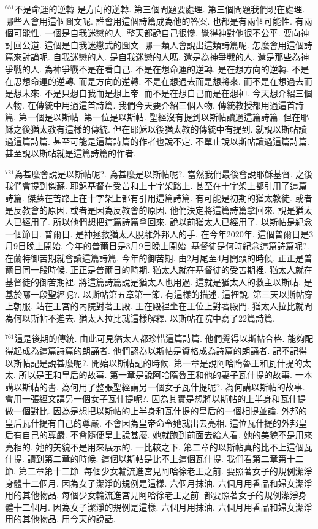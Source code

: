 \documentclass{book}
\begin{document}
$^{681}$不是命運的逆轉 是方向的逆轉.
第三個問題要處理.
第三個問題我們現在處理.
哪些人會用這個圖文呢.
誰會用這個詩篇成為他的答案.
也都是有兩個可能性.
有兩個可能性.
一個是自我迷戀的人.
整天都說自己很慘.
覺得神對他很不公平.
要向神討回公道.
這個是自我迷戀式的圖文.
哪一類人會說出這類詩篇呢.
怎麼會用這個詩篇來討論呢.
自我迷戀的人.
是自我迷戀的人嗎.
還是為神爭戰的人.
還是那些為神爭戰的人.
為神爭戰不是在看自己.
不是在想命運的逆轉.
是在想方向的逆轉.
不是在思想命運的逆轉.
而是方向的逆轉.
不是在想過去而是想將來.
而不是在想過去而是想未來.
不是只想自我而是想上帝.
而不是在想自己而是在想神.
今天想介紹三個人物.
在傳統中用過這首詩篇.
我們今天要介紹三個人物.
傳統教授都用過這首詩篇.
第一個是以斯帖.
第一位是以斯帖.
聖經沒有提到以斯帖讀過這篇詩篇.
但在耶穌之後猶太教有這樣的傳統.
但在耶穌以後猶太教的傳統中有提到.
就說以斯帖讀過這篇詩篇.
甚至可能是這篇詩篇的作者也說不定.
不單止說以斯帖讀過這篇詩篇.
甚至說以斯帖就是這篇詩篇的作者.

$^{721}$為甚麼會說是以斯帖呢?.
為甚麼是以斯帖呢?.
當然我們最後會說耶穌基督.
之後我們會提到傑蘇.
耶穌基督在受苦和上十字架路上.
甚至在十字架上都引用了這篇詩篇.
傑蘇在苦路上在十字架上都有引用這篇詩篇.
有可能是初期的猶太教徒.
或者是反教會的原因.
或者是因為反教會的原因.
他們決定將這篇詩篇拿回來.
說是猶太人已經用了.
所以他們想把這篇詩篇拿回來.
說以前猶太人已經用了.
以斯帖是紀念一個節日.
普爾日.
是神拯救猶太人脫離外邦人的手.
在今年2020年.
這個普爾日是3月9日晚上開始.
今年的普爾日是3月9日晚上開始.
基督徒是何時紀念這篇詩篇呢?.
在蘭特御苦期就會讀這篇詩篇.
今年的御苦期.
由2月尾至4月開頭的時候.
正正是普爾日同一段時候.
正正是普爾日的時期.
猶太人就在基督徒的受苦期裡.
猶太人就在基督徒的御苦期裡.
將這篇詩篇說是猶太人也用過.
這就是猶太人的救主以斯帖.
是基於哪一段聖經呢?.
以斯帖第五章第一節.
有這樣的描述.
這裡說.
第三天以斯帖穿上朝服.
站在王宮的內院對著王殿.
王在殿裡坐在王位上對著殿門.
猶太人拉比就問為何以斯帖不進去.
猶太人拉比就這樣解釋.
以斯帖在院中寫了22篇詩篇.

$^{761}$這是後期的傳統.
由此可見猶太人都珍惜這篇詩篇.
他們覺得以斯帖合格.
能夠配得起成為這篇詩篇的朗誦者.
他們認為以斯帖是資格成為詩篇的朗誦者.
記不記得以斯帖記是說甚麼呢?.
開始以斯帖記的時候.
第一章是說阿哈隋魯王和瓦什提的太太.
所以是王和皇后的故事.
第一章是說阿哈隋魯王和他的妻子瓦什提的故事.
一本講以斯帖的書.
為何用了整張聖經講另一個女子瓦什提呢?.
為何講以斯帖的故事.
會用一張經文講另一個女子瓦什提呢?.
因為其實是想將以斯帖的上半身和瓦什提做一個對比.
因為是想把以斯帖的上半身和瓦什提的皇后的一個相提並論.
外邦的皇后瓦什提有自己的尊嚴.
不會因為皇帝命令她就出去亮相.
這位瓦什提的外邦皇后有自己的尊嚴.
不會隨便皇上說甚麼.
她就跑到前面去給人看.
她的美貌不是用來亮相的.
她的美貌不是用來展示的.
一比較之下.
第二章的以斯帖真的比不上這個瓦什提.
讀到第二章的時候.
這個以斯帖是比不上這個瓦什提.
我們看第二章第十二節.
第二章第十二節.
每個少女輪流進宮見阿哈徐老王之前.
要照著女子的規例潔淨身體十二個月.
因為女子潔淨的規例是這樣.
六個月抹油.
六個月用香品和婦女潔淨用的其他物品.
每個少女輪流進宮見阿哈徐老王之前.
都要照著女子的規例潔淨身體十二個月.
因為女子潔淨的規例是這樣.
六個月用抹油.
六個月用香品和婦女潔淨用的其他物品.
用今天的說話.
\end{document}
